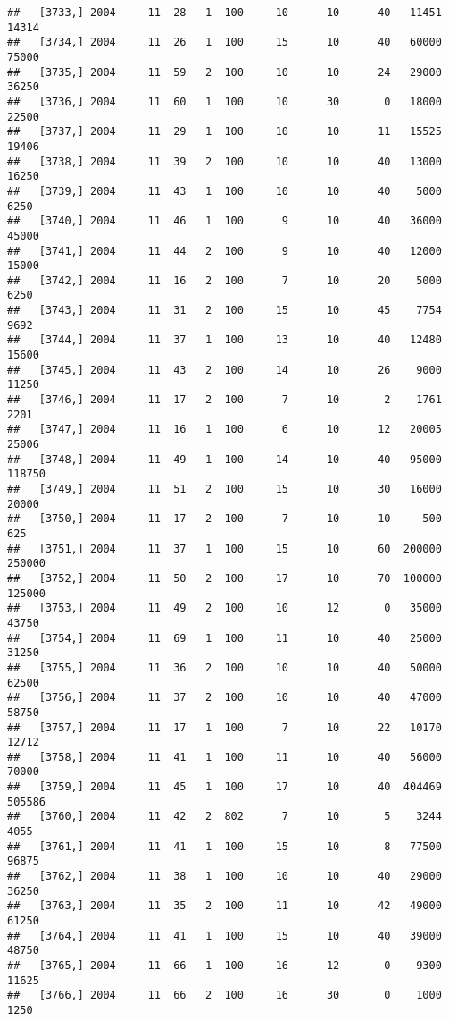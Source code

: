 \documentclass{article}\usepackage[]{graphicx}\usepackage[]{color}
\makeatletter
\newenvironment{kframe}{%
 \def\at@end@of@kframe{}%
 \ifinner\ifhmode%
  \def\at@end@of@kframe{\end{minipage}}%
  \begin{minipage}{\columnwidth}%
 \fi\fi%
 \def\FrameCommand##1{\hskip\@totalleftmargin \hskip-\fboxsep
 \colorbox{shadecolor}{##1}\hskip-\fboxsep
     \hskip-\linewidth \hskip-\@totalleftmargin \hskip\columnwidth}%
 \MakeFramed {\advance\hsize-\width
   \@totalleftmargin\z@ \linewidth\hsize
   \@setminipage}}%
 {\par\unskip\endMakeFramed%
 \at@end@of@kframe}
\newenvironment{knitrout}{}{} %
\makeatother
\begin{document}
\begin{knitrout}
\begin{kframe}
\begin{verbatim}
##   [3733,] 2004     11  28   1  100     10      10      40   11451   14314
##   [3734,] 2004     11  26   1  100     15      10      40   60000   75000
##   [3735,] 2004     11  59   2  100     10      10      24   29000   36250
##   [3736,] 2004     11  60   1  100     10      30       0   18000   22500
##   [3737,] 2004     11  29   1  100     10      10      11   15525   19406
##   [3738,] 2004     11  39   2  100     10      10      40   13000   16250
##   [3739,] 2004     11  43   1  100     10      10      40    5000    6250
##   [3740,] 2004     11  46   1  100      9      10      40   36000   45000
##   [3741,] 2004     11  44   2  100      9      10      40   12000   15000
##   [3742,] 2004     11  16   2  100      7      10      20    5000    6250
##   [3743,] 2004     11  31   2  100     15      10      45    7754    9692
##   [3744,] 2004     11  37   1  100     13      10      40   12480   15600
##   [3745,] 2004     11  43   2  100     14      10      26    9000   11250
##   [3746,] 2004     11  17   2  100      7      10       2    1761    2201
##   [3747,] 2004     11  16   1  100      6      10      12   20005   25006
##   [3748,] 2004     11  49   1  100     14      10      40   95000  118750
##   [3749,] 2004     11  51   2  100     15      10      30   16000   20000
##   [3750,] 2004     11  17   2  100      7      10      10     500     625
##   [3751,] 2004     11  37   1  100     15      10      60  200000  250000
##   [3752,] 2004     11  50   2  100     17      10      70  100000  125000
##   [3753,] 2004     11  49   2  100     10      12       0   35000   43750
##   [3754,] 2004     11  69   1  100     11      10      40   25000   31250
##   [3755,] 2004     11  36   2  100     10      10      40   50000   62500
##   [3756,] 2004     11  37   2  100     10      10      40   47000   58750
##   [3757,] 2004     11  17   1  100      7      10      22   10170   12712
##   [3758,] 2004     11  41   1  100     11      10      40   56000   70000
##   [3759,] 2004     11  45   1  100     17      10      40  404469  505586
##   [3760,] 2004     11  42   2  802      7      10       5    3244    4055
##   [3761,] 2004     11  41   1  100     15      10       8   77500   96875
##   [3762,] 2004     11  38   1  100     10      10      40   29000   36250
##   [3763,] 2004     11  35   2  100     11      10      42   49000   61250
##   [3764,] 2004     11  41   1  100     15      10      40   39000   48750
##   [3765,] 2004     11  66   1  100     16      12       0    9300   11625
##   [3766,] 2004     11  66   2  100     16      30       0    1000    1250

\end{verbatim}
\end{kframe}
\end{knitrout}
\end{document}
